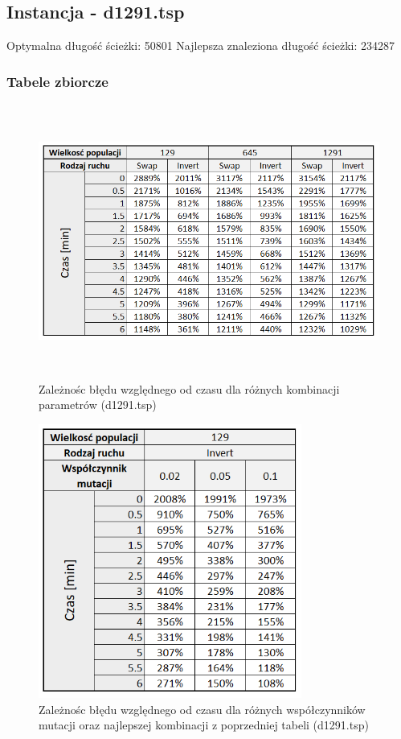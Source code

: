 \documentclass[a4paper,11pt]{article}
\begin{document}
\newpage
\subsection{Instancja - d1291.tsp}

Optymalna długość ścieżki: 50801
\newline Najlepsza znaleziona długość ścieżki: 234287

\subsubsection{Tabele zbiorcze}

\begin{figure}[H]
\centering
\includegraphics[height=9cm]{t3.PNG}
\caption{Zależnośc błędu względnego od czasu dla różnych kombinacji parametrów (d1291.tsp)}
\end{figure}

\begin{figure}[H]
\centering
\includegraphics[height=9cm]{t6.PNG}
\caption{Zależnośc błędu względnego od czasu dla różnych współczynników mutacji oraz najlepszej kombinacji z poprzedniej tabeli (d1291.tsp)}
\end{figure}
\newpage
\end{document}
